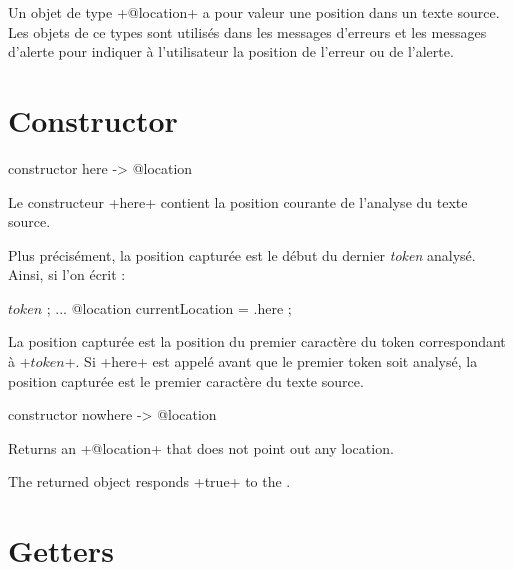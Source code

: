 

Un objet de type \ggs+@location+ a pour valeur une position dans un texte source. Les objets de ce types sont utilisés dans les messages d'erreurs et les messages d'alerte pour indiquer à l'utilisateur la position de l'erreur ou de l'alerte.











\section{Constructor}



\begin{galgascode}
constructor here -> @location
\end{galgascode}

Le constructeur \ggs+here+ contient la position courante de l'analyse du texte source.

Plus précisément, la position capturée est le début du dernier \emph{token} analysé. Ainsi, si l'on écrit :

\begin{galgascode}
  $token$ ;
  ...
  @location currentLocation = .here ;
\end{galgascode}

La position capturée est la position du premier caractère du token correspondant à \ggs+$token$+. Si \ggs+here+ est appelé avant que le premier token soit analysé, la position capturée est le premier caractère du texte source.







\begin{galgascode}
constructor nowhere -> @location
\end{galgascode}


Returns an \ggs+@location+ that does not point out any location.

The returned object responds \ggs+true+ to the .

\section{Getters}

